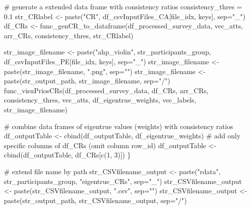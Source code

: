 \documentclass[
]{article}
\newenvironment{Shaded}{\begin{snugshade}}{\end{snugshade}}
\newcommand{\AttributeTok}[1]{\textcolor[rgb]{0.00,0.34,0.68}{#1}}
\newcommand{\CommentTok}[1]{\textcolor[rgb]{0.54,0.53,0.53}{#1}}
\newcommand{\DecValTok}[1]{\textcolor[rgb]{0.69,0.50,0.00}{#1}}
\newcommand{\FloatTok}[1]{\textcolor[rgb]{0.69,0.50,0.00}{#1}}
\newcommand{\FunctionTok}[1]{\textcolor[rgb]{0.39,0.29,0.61}{#1}}
\newcommand{\NormalTok}[1]{\textcolor[rgb]{0.12,0.11,0.11}{#1}}
\newcommand{\OtherTok}[1]{\textcolor[rgb]{0.00,0.43,0.16}{#1}}
\newcommand{\StringTok}[1]{\textcolor[rgb]{0.75,0.01,0.01}{#1}}
\begin{document}
\begin{Shaded}
\begin{Highlighting}[]
  \CommentTok{\# generate a extended data frame with consistency ratios}
\NormalTok{  consistency\_thres }\OtherTok{=} \FloatTok{0.1}
\NormalTok{  str\_CRlabel }\OtherTok{\textless{}{-}} \FunctionTok{paste}\NormalTok{(}\StringTok{"CR"}\NormalTok{, df\_csvInputFiles\_CA[file\_idx, keys], }\AttributeTok{sep=}\StringTok{"\_"}\NormalTok{)}
\NormalTok{  df\_CRs }\OtherTok{\textless{}{-}} \FunctionTok{func\_genCR\_to\_dataframe}\NormalTok{(df\_processed\_survey\_data, vec\_atts, arr\_CRs, consistency\_thres, str\_CRlabel)}
  
\NormalTok{  str\_image\_filename }\OtherTok{\textless{}{-}} \FunctionTok{paste}\NormalTok{(}\StringTok{"ahp\_violin"}\NormalTok{, str\_participants\_group, df\_csvInputFiles\_PE[file\_idx, keys], }\AttributeTok{sep=}\StringTok{"\_"}\NormalTok{)}
\NormalTok{  str\_image\_filename }\OtherTok{\textless{}{-}} \FunctionTok{paste}\NormalTok{(str\_image\_filename, }\StringTok{".png"}\NormalTok{, }\AttributeTok{sep=}\StringTok{""}\NormalTok{)}
\NormalTok{  str\_image\_filename }\OtherTok{\textless{}{-}} \FunctionTok{paste}\NormalTok{(str\_output\_path, str\_image\_filename, }\AttributeTok{sep=}\StringTok{"/"}\NormalTok{)}
  \FunctionTok{func\_visuPriosCRs}\NormalTok{(df\_processed\_survey\_data, df\_CRs, arr\_CRs, consistency\_thres, vec\_atts, df\_eigentrue\_weights, vec\_labels, str\_image\_filename)}
  
  \CommentTok{\# combine data frames of eigentrue values (weights) with consistency ratios}
\NormalTok{  df\_outputTable }\OtherTok{\textless{}{-}} \FunctionTok{cbind}\NormalTok{(df\_outputTable, df\_eigentrue\_weights)}
  \CommentTok{\# add only specific columns of \textquotesingle{}df\_CRs\textquotesingle{} (omit column \textquotesingle{}row\_id\textquotesingle{})}
\NormalTok{  df\_outputTable }\OtherTok{\textless{}{-}} \FunctionTok{cbind}\NormalTok{(df\_outputTable, df\_CRs[}\FunctionTok{c}\NormalTok{(}\DecValTok{1}\NormalTok{, }\DecValTok{3}\NormalTok{)])}
\NormalTok{\}}

\CommentTok{\# extend file name by path}
\NormalTok{str\_CSVfilename\_output }\OtherTok{\textless{}{-}} \FunctionTok{paste}\NormalTok{(}\StringTok{"rdata"}\NormalTok{, str\_participants\_group, }\StringTok{"eigentrue\_CRs"}\NormalTok{, }\AttributeTok{sep=}\StringTok{"\_"}\NormalTok{)}
\NormalTok{str\_CSVfilename\_output }\OtherTok{\textless{}{-}} \FunctionTok{paste}\NormalTok{(str\_CSVfilename\_output, }\StringTok{".csv"}\NormalTok{, }\AttributeTok{sep=}\StringTok{""}\NormalTok{)}
\NormalTok{str\_CSVfilename\_output }\OtherTok{\textless{}{-}} \FunctionTok{paste}\NormalTok{(str\_output\_path, str\_CSVfilename\_output, }\AttributeTok{sep=}\StringTok{"/"}\NormalTok{)}


\end{Highlighting}
\end{Shaded}
\end{document}
